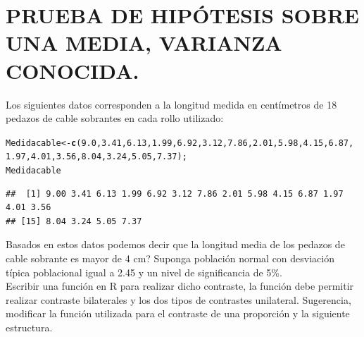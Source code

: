 \documentclass[12pt,letterpaper]{article}\usepackage[]{graphicx}\usepackage[]{color}
\makeatletter
\newcommand{\hlnum}[1]{\textcolor[rgb]{0.686,0.059,0.569}{#1}}%
\newcommand{\hlstd}[1]{\textcolor[rgb]{0.345,0.345,0.345}{#1}}%
\newcommand{\hlkwb}[1]{\textcolor[rgb]{0.69,0.353,0.396}{#1}}%
\newcommand{\hlkwd}[1]{\textcolor[rgb]{0.737,0.353,0.396}{\textbf{#1}}}%
\newenvironment{kframe}{%
 \def\at@end@of@kframe{}%
 \ifinner\ifhmode%
  \def\at@end@of@kframe{\end{minipage}}%
  \begin{minipage}{\columnwidth}%
 \fi\fi%
 \def\FrameCommand##1{\hskip\@totalleftmargin \hskip-\fboxsep
 \colorbox{shadecolor}{##1}\hskip-\fboxsep
     \hskip-\linewidth \hskip-\@totalleftmargin \hskip\columnwidth}%
 \MakeFramed {\advance\hsize-\width
   \@totalleftmargin\z@ \linewidth\hsize
   \@setminipage}}%
 {\par\unskip\endMakeFramed%
 \at@end@of@kframe}
\newenvironment{knitrout}{}{} %
\makeatother
\begin{document}
\section{PRUEBA DE HIP\'OTESIS SOBRE UNA MEDIA, VARIANZA CONOCIDA.}

Los siguientes datos corresponden a la longitud medida en cent\'imetros de 18 pedazos de cable sobrantes en cada rollo utilizado:
\begin{knitrout}
\color{fgcolor}\begin{kframe}
\begin{alltt}
\hlstd{Medidacable} \hlkwb{<-} \hlkwd{c}\hlstd{(}\hlnum{9.0}\hlstd{,} \hlnum{3.41}\hlstd{,} \hlnum{6.13}\hlstd{,} \hlnum{1.99}\hlstd{,} \hlnum{6.92}\hlstd{,} \hlnum{3.12}\hlstd{,} \hlnum{7.86}\hlstd{,} \hlnum{2.01}\hlstd{,} \hlnum{5.98}\hlstd{,} \hlnum{4.15}\hlstd{,} \hlnum{6.87}\hlstd{,}
                 \hlnum{1.97}\hlstd{,} \hlnum{4.01}\hlstd{,} \hlnum{3.56}\hlstd{,} \hlnum{8.04}\hlstd{,} \hlnum{3.24}\hlstd{,} \hlnum{5.05}\hlstd{,} \hlnum{7.37}\hlstd{);}
\hlstd{Medidacable}
\end{alltt}
\begin{verbatim}
##  [1] 9.00 3.41 6.13 1.99 6.92 3.12 7.86 2.01 5.98 4.15 6.87 1.97 4.01 3.56
## [15] 8.04 3.24 5.05 7.37
\end{verbatim}
\end{kframe}
\end{knitrout}

Basados en estos datos \¿podemos decir que la longitud media de los pedazos de cable sobrante es mayor de 4 cm? Suponga poblaci\'on normal con desviaci\'on t\'ipica poblacional igual a 2.45 y un nivel de significancia de 5\%.\\

Escribir una funci\'on en R para realizar dicho contraste, la funci\'on debe permitir realizar contraste bilaterales y los dos tipos de contrastes unilateral. Sugerencia, modificar la funci\'on utilizada para el contraste de una proporci\'on y la siguiente estructura.\\
\end{document}

